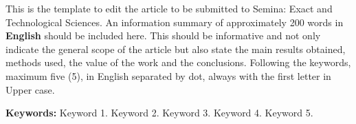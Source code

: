 \documentclass[article,10pt,twoside,a4paper,twocolumn,hidelinks,english,brazil]{abntex2}
\begin{document}
\captionsetup{format=plain,justification=justified,singlelinecheck=false} 

\frenchspacing

\pretextual
\SingleSpacing
\onecolumn

\maketitle
\vspace{-1.2cm}

\thispagestyle{firstpage}


\renewcommand{\resumoname}{\texorpdfstring{\fontsize{14pt}{16.8pt} \fontfamily{ptm} \selectfont \textbf{Abstract} \\[-0.3cm] \rule{0.91\textwidth}{0.5pt} \vspace{-0.5cm}}{Abstract}}
\begin{resumoumacoluna}
    \normalsize
	This is the template to edit the article to be submitted to Semina: Exact and Technological Sciences. An information summary of approximately 200 words in \textbf{English} should be included here. This should be informative and not only indicate the general scope of the article but also state the main results obtained, methods used, the value of the work and the conclusions.
Following the keywords, maximum five (5), in English separated by dot, always with the first letter in Upper case.
	
	\vspace{0.15cm}
    \noindent \textbf{Keywords:} Keyword 1. Keyword 2. Keyword 3. Keyword 4. Keyword 5. 	 
	
\end{resumoumacoluna}
\vspace{0.3cm}
\end{document}
